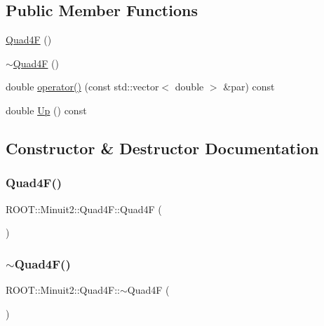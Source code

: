 \subsection*{Public Member Functions}
\begin{DoxyCompactItemize}
\item 
\mbox{\hyperlink{classROOT_1_1Minuit2_1_1Quad4F_a419218c0cf1b6dde24c0fbc44d30b68c}{Quad4F}} ()
\item 
\mbox{\hyperlink{classROOT_1_1Minuit2_1_1Quad4F_a93ee61442fd15112effb14f416e296ce}{$\sim$\+Quad4F}} ()
\item 
double \mbox{\hyperlink{classROOT_1_1Minuit2_1_1Quad4F_a41964a71fa65445e18c041fbdc724a03}{operator()}} (const std\+::vector$<$ double $>$ \&par) const
\item 
double \mbox{\hyperlink{classROOT_1_1Minuit2_1_1Quad4F_a19ebb5413722895a7635626cca02ebe9}{Up}} () const
\end{DoxyCompactItemize}


\subsection{Constructor \& Destructor Documentation}
\mbox{\label{classROOT_1_1Minuit2_1_1Quad4F_a419218c0cf1b6dde24c0fbc44d30b68c}} 
\subsubsection{\texorpdfstring{Quad4F()}{Quad4F()}}
{\footnotesize\ttfamily R\+O\+O\+T\+::\+Minuit2\+::\+Quad4\+F\+::\+Quad4F (\begin{DoxyParamCaption}{ }\end{DoxyParamCaption})\hspace{0.3cm}{\ttfamily [inline]}}

\mbox{\label{classROOT_1_1Minuit2_1_1Quad4F_a93ee61442fd15112effb14f416e296ce}} 
\subsubsection{\texorpdfstring{$\sim$Quad4F()}{~Quad4F()}}
{\footnotesize\ttfamily R\+O\+O\+T\+::\+Minuit2\+::\+Quad4\+F\+::$\sim$\+Quad4F (\begin{DoxyParamCaption}{ }\end{DoxyParamCaption})\hspace{0.3cm}{\ttfamily [inline]}}



